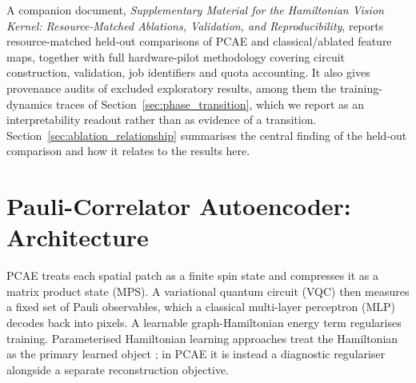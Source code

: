 \documentclass[pdflatex,sn-basic]{sn-jnl}
\begin{document}
A companion document, \textit{Supplementary Material for the Hamiltonian Vision
Kernel: Resource-Matched Ablations, Validation, and Reproducibility}, reports
resource-matched held-out comparisons of PCAE and classical/ablated feature maps,
together with full hardware-pilot methodology covering circuit construction,
validation, job identifiers and quota accounting. It also gives provenance audits
of excluded exploratory results, among them the training-dynamics traces of
Section~\ref{sec:phase_transition}, which we report as an interpretability
readout rather than as evidence of a transition.
Section~\ref{sec:ablation_relationship} summarises the central finding of the
held-out comparison and how it relates to the results here.

\section{Pauli-Correlator Autoencoder: Architecture}
\label{sec:architecture}

PCAE treats each spatial patch as a finite spin state and compresses it as a
matrix product state (MPS). A variational quantum circuit (VQC) then measures a
fixed set of Pauli observables, which a classical multi-layer perceptron (MLP)
decodes back into pixels. A learnable graph-Hamiltonian energy term regularises
training. Parameterised Hamiltonian learning approaches treat the Hamiltonian as
the primary learned object \citep{Shi2022}; in PCAE it is instead a diagnostic
regulariser alongside a separate reconstruction objective.
\end{document}
